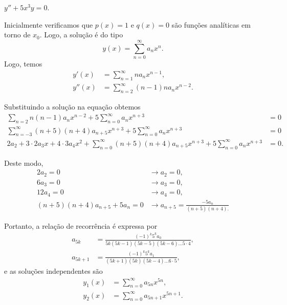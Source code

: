 \documentclass[a4paper,12pt, leqno, answers]{exam}
\begin{document}
\begin{questions}
    \question $y'' + 5 x^3 y = 0$.
    \begin{solution}
        Inicialmente verificamos que $p(x) = 1$ e $q(x) = 0$ s\~{a}o fun\c{c}\~{o}es anal\'{i}ticas em torno de $x_0$. Logo, a solu\c{c}\~{a}o \'{e} do tipo
        \[
        y(x) = \sum_{n = 0}^\infty a_n x^n.
        \]
        Logo, temos
        \begin{align*}
            y'(x) &= \sum_{n = 1}^\infty n a_n x^{n -1}, \\
            y''(x) &= \sum_{n = 2}^\infty \left( n -1 \right) n a_n x^{n -2}.
        \end{align*}

        Substituindo a solu\c{c}\~{a}o na equa\c{c}\~{a}o obtemos
        \begin{align*}
            \sum_{n = 2} n \left( n -1 \right) a_n x^{n -2} + 5  \sum_{n = 0}^\infty a_n x^{n + 3} &= 0 \\
            \sum_{n = -3}^\infty \left( n + 5 \right) \left( n + 4 \right) a_{n + 5} x^{n +3} + 5 \sum_{n = 0}^\infty a_n x^{n + 3} &= 0 \\
            2 a_2 + 3 \cdot 2 a_3 x + 4 \cdot 3 a_4 x^2 + \sum_{n = 0}^\infty \left( n + 5 \right) \left( n + 4 \right) a_{n + 5} x^{n + 3} + 5 \sum_{n = 0}^\infty a_n x^{n + 3} &= 0.
        \end{align*}

        Deste modo,
        \begin{align*}
            2 a_2 = 0 &\rightarrow a_2 = 0, \\
            6 a_3 = 0 &\rightarrow a_3 = 0, \\
            12 a_4 = 0 &\rightarrow a_4 = 0, \\
            \left( n + 5 \right) \left( n + 4 \right) a_{n + 5} + 5 a_n = 0 &\rightarrow a_{n + 5} = \frac{-5 a_n}{\left( n + 5 \right) \left( n + 4 \right).}
        \end{align*}

        Portanto, a rela\c{c}\~{a}o de recorr\^{e}ncia \'{e} expressa por
        \begin{align*}
            a_{5k} &= \frac{\left( -1 \right)^k 5^k a_0}{5k \left( 5k - 1 \right) \left( 5k - 5 \right) \left( 5k - 6 \right) \ldots 5 \cdot 4}, \\
            a_{5k + 1} &= \frac{\left( -1 \right)^k 5^k a_1}{\left( 5k + 1 \right) \left( 5k \right) \left( 5k - 4 \right) \ldots 6 \cdot 5},
        \end{align*}
        e as solu\c{c}\~{o}es independentes s\~{a}o
        \begin{align*}
            y_1(x) &= \sum_{n = 0}^\infty a_{5n} x^{5n}, \\
            y_2(x) &= \sum_{n = 0}^\infty a_{5n + 1} x^{5n + 1}.
        \end{align*}
    \end{solution}


\end{questions}
\end{document}
